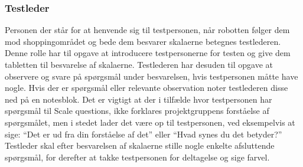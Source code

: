 \subsubsection*{Testleder}
Personen der står for at henvende sig til testpersonen, når robotten følger dem mod shoppingområdet og bede dem besvarer skalaerne betegnes testlederen. Denne rolle har til opgave at introducere testpersonerne for testen og give dem tabletten til besvarelse af skalaerne. \blankline
%
Testlederen har desuden til opgave at observere og svare på spørgsmål under besvarelsen, hvis testpersonen måtte have nogle. Hvis der er spørgsmål eller relevante observation noter testlederen disse ned på en notesblok. Det er vigtigt at der i tilfælde hvor testpersonen har spørgsmål til Scale questions, ikke forklares projektgruppens forståelse af spørgsmålet, men i stedet lader det være op til testpersonen, ved eksempelvis at sige: “Det er ud fra din forståelse af det” eller “Hvad synes du det betyder?” \blankline
% 
Testleder skal efter besvarelsen af skalaerne stille nogle enkelte afsluttende spørgsmål, for derefter at takke testpersonen for deltagelse og sige farvel.  



